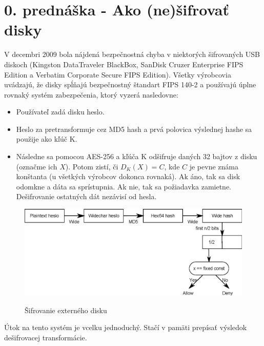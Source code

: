\section{0. prednáška - Ako (ne)šifrovať disky}

V decembri 2009 bola nájdená bezpečnostná chyba v niektorých šifrovaných USB diskoch
(Kingston DataTraveler BlackBox, SanDisk Cruzer Enterprise FIPS Edition a
Verbatim Corporate Secure FIPS Edition). Všetky výrobcovia uvádzajú, že disky
spĺňajú bezpečnostný štandart FIPS 140-2 a používajú úplne rovnaký systém zabezpečenia,
ktorý vyzerá nasledovne:
\begin{itemize}
\item Používateľ zadá disku heslo.
\item Heslo za pretransformuje cez MD5 hash a prvá polovica výslednej hashe sa použije ako kľúč K.
\item Následne sa pomocou AES-256 a kľúča K odšifruje daných 32 bajtov z disku (označme ich $X$). Potom zistí, či
$D_K(X)=C$, kde $C$ je pevne známa konštanta (u všetkých výrobcov dokonca rovnaká). Ak áno, tak sa disk odomkne a dáta sa sprístupnia.
Ak nie, tak sa požiadavka zamietne. Dešifrovanie ostatných dát nezávisí od hesla.
\end{itemize}

\begin{figure}[htp]
    \centering
    \includegraphics[scale=0.75]{img/0/extern_drive_encryption}
    \label{fig:extern_drive_encryption}
    \caption{Šifrovanie externého disku}
\end{figure}

Útok na tento systém je vcelku jednoduchý. Stačí v pamäti prepísať výsledok dešifrovacej transformácie. 



